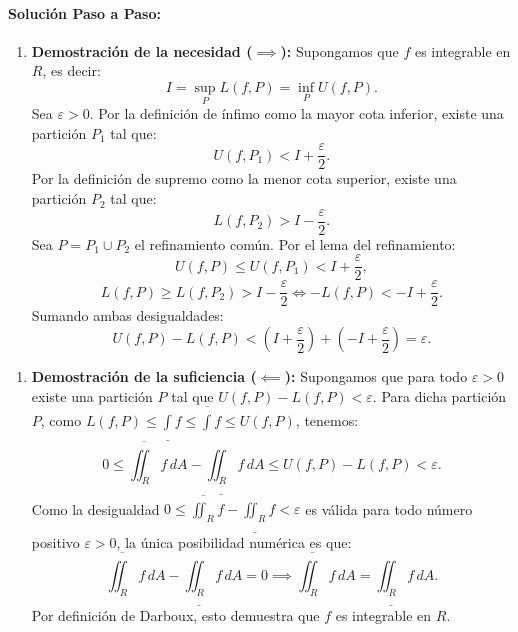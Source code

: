 \documentclass[11pt,a4paper]{article}
\begin{document}
\paragraph{Solución Paso a Paso:}\par
\begin{enumerate}[label=\textbf{\arabic*.}]
\item \textbf{Demostración de la necesidad ($\implies$):}
Supongamos que $f$ es integrable en $R$, es decir:
\begin{equation*}
I = \sup_P L(f, P) = \inf_P U(f, P).
\end{equation*}
Sea $\varepsilon > 0$. Por la definición de ínfimo como la mayor cota inferior, existe una partición $P_1$ tal que:
\begin{equation*}
U(f, P_1) < I + \frac{\varepsilon}{2}.
\end{equation*}
Por la definición de supremo como la menor cota superior, existe una partición $P_2$ tal que:
\begin{equation*}
L(f, P_2) > I - \frac{\varepsilon}{2}.
\end{equation*}
Sea $P = P_1 \cup P_2$ el refinamiento común. Por el lema del refinamiento:
\begin{equation*}
U(f, P) \le U(f, P_1) < I + \frac{\varepsilon}{2},
\end{equation*}
\begin{equation*}
L(f, P) \ge L(f, P_2) > I - \frac{\varepsilon}{2} \iff -L(f, P) < -I + \frac{\varepsilon}{2}.
\end{equation*}
Sumando ambas desigualdades:
\begin{equation*}
U(f, P) - L(f, P) < \left(I + \frac{\varepsilon}{2}\right) + \left(-I + \frac{\varepsilon}{2}\right) = \varepsilon.
\end{equation*}
\end{enumerate}

\begin{enumerate}[label=\textbf{\arabic*.}]
\item \textbf{Demostración de la suficiencia ($\impliedby$):}
Supongamos que para todo $\varepsilon > 0$ existe una partición $P$ tal que $U(f, P) - L(f, P) < \varepsilon$.
Para dicha partición $P$, como $L(f, P) \le \underline{\int} f \le \overline{\int} f \le U(f, P)$, tenemos:
\begin{equation*}
0 \le \overline{\iint_R} f \, dA - \underline{\iint_R} f \, dA \le U(f, P) - L(f, P) < \varepsilon.
\end{equation*}
Como la desigualdad $0 \le \overline{\iint_R} f - \underline{\iint_R} f < \varepsilon$ es válida para todo número positivo $\varepsilon > 0$, la única posibilidad numérica es que:
\begin{equation*}
\overline{\iint_R} f \, dA - \underline{\iint_R} f \, dA = 0 \implies \overline{\iint_R} f \, dA = \underline{\iint_R} f \, dA.
\end{equation*}
Por definición de Darboux, esto demuestra que $f$ es integrable en $R$.
\end{enumerate}
\end{document}
